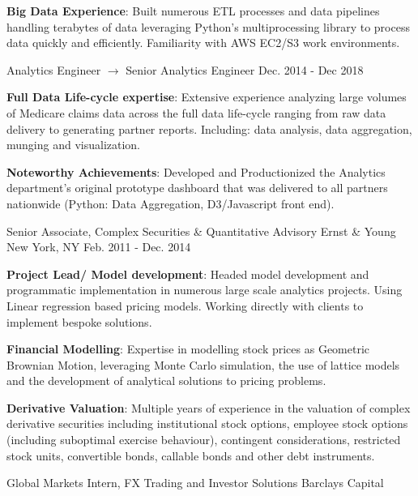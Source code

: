 \begin{cventries}
{\begin{cvitems}
          \item {\textbf{Big Data Experience}: Built numerous ETL processes and data pipelines handling terabytes of data leveraging Python's multiprocessing library to process data quickly and efficiently. Familiarity with AWS EC2/S3 work environments.}          
      \end{cvitems}
    }
  \cventry
    {Analytics Engineer $\rightarrow$ Senior Analytics Engineer}
    {}
    {}
    {Dec. 2014 - Dec 2018}
    {
      \begin{cvitems}
          \item {\textbf{Full Data Life-cycle expertise}: Extensive experience analyzing large volumes of Medicare claims data across the full data life-cycle ranging from raw data delivery to generating partner reports. Including: data analysis, data aggregation, munging and visualization.
          }
          \item {\textbf{Noteworthy Achievements}: Developed and Productionized the Analytics department's original prototype dashboard that was delivered to all partners nationwide (Python: Data Aggregation, D3/Javascript front end).
          }
      \end{cvitems}
    }
  \cventry
    {Senior Associate, Complex Securities \& Quantitative Advisory}
    {Ernst \& Young}
    {New York, NY}
    {Feb. 2011 - Dec. 2014}
    {
      \begin{cvitems}
        \item {\textbf{Project Lead/ Model development}: Headed model development and programmatic implementation in numerous large scale analytics projects. Using Linear regression based pricing models. Working directly with clients to implement bespoke solutions}.
        \item {\textbf{Financial Modelling}: Expertise in modelling stock prices as Geometric Brownian Motion, leveraging Monte Carlo simulation, the use of lattice models and the development of analytical solutions to pricing problems}.
        \item {\textbf{Derivative Valuation}: Multiple years of experience in the valuation of complex derivative securities including institutional stock options, employee stock options (including suboptimal exercise behaviour), contingent considerations, restricted stock units, convertible bonds, callable bonds and other debt instruments}.
      \end{cvitems}
    }
  \cventry
    {Global Markets Intern, FX Trading and Investor Solutions}
    {Barclays Capital}

\end{cventries}
